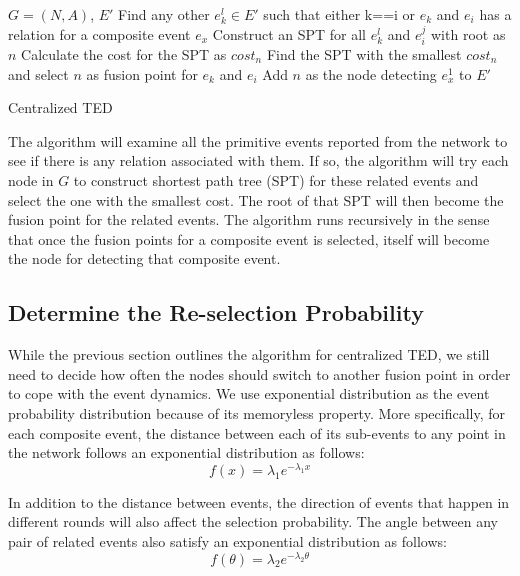 \begin{algorithm}
\begin{algorithmic}
\REQUIRE \(G=(N,A)\), \(E'\)
			\STATE Find any other \(e_k^l\in E'\) such that either k==i or \(e_k\) and \(e_i\) has a relation for a composite event \(e_x\)
				\STATE Construct an SPT for all \(e_k^l\) and \(e_i^j\) with root as \(n\)
				\STATE Calculate the cost for the SPT as \(cost_n\)
			\ENDFOR
			\STATE Find the SPT with the smallest \(cost_n\) and select \(n\) as fusion point for \(e_k\) and \(e_i\)
			\STATE Add \(n\) as the node detecting \(e_x^1\) to \(E'\)
		\ENDIF
	\ENDFOR
\end{algorithmic}
\caption{Centralized TED}
\label{algo:centralizedCEDU}
\end{algorithm}

The algorithm will examine all the primitive events reported from the network to see if there is any relation associated with them. If so, the algorithm will try each node in \(G\) to construct shortest path tree (SPT) for these related events and select the one with the smallest cost. The root of that SPT will then become the fusion point for the related events. The algorithm runs recursively in the sense that once the fusion points for a composite event is selected, itself will become the node for detecting that composite event.

\subsection{Determine the Re-selection Probability}
\label{sec:reselection}
While the previous section outlines the algorithm for centralized TED, we still need to decide how often the nodes should switch to another fusion point in order to cope with the event dynamics. We use exponential distribution as the event probability distribution because of its memoryless property. More specifically, for each composite event, the distance between each of its sub-events to any point in the network follows an exponential distribution as follows:
\begin{displaymath}
f(x)={\lambda}_1e^{-{\lambda}_1x}
\end{displaymath}

In addition to the distance between events, the direction of events that happen in different rounds will also affect the selection probability. The angle between any pair of related events also satisfy an exponential distribution as follows:
\begin{displaymath}
f(\theta)={\lambda}_2e^{-{\lambda}_2\theta}
\end{displaymath}

